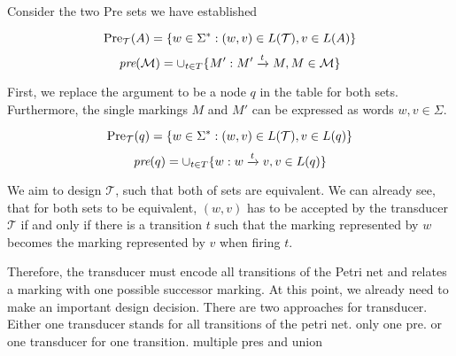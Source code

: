 \par

Consider the two Pre sets we have established

\begin{equation*}
\text{Pre}_{\mathcal{T}}(A) = \{ w \in \Sigma^{*}: (w,v) \in L(\mathcal{T}), v \in L(A) \} \\
\end{equation*}
\begin{equation*}
\operatorname{\textit{pre}}(\mathcal{M}) = \cup_{t \in T} \{M': M' \xrightarrow{t} M, M \in \mathcal{M} \}
\end{equation*}

First, we replace the argument to be a node $q$ in the table for both sets. Furthermore, the single markings $M$ and $M'$ can be expressed as words $w,v \in \Sigma$. 

\begin{equation*}
\text{Pre}_{\mathcal{T}}(q) = \{ w \in \Sigma^{*}: (w,v) \in L(\mathcal{T}), v \in L(q) \} \\
\end{equation*}
\begin{equation*}
\operatorname{\textit{pre}}(q) = \cup_{t \in T} \{w: w \xrightarrow{t} v, v \in L(q) \}
\end{equation*}

We aim to design $\mathcal{T}$, such that both of sets are equivalent. We can already see, that for both sets to be equivalent, $(w,v)$ has to be accepted by the transducer $\mathcal{T}$ if and only if there is a transition $t$ such that the marking represented by $w$ becomes the marking represented by $v$ when firing $t$.

\par

Therefore, the transducer must encode all transitions of the Petri net and relates a marking with one possible successor marking.
At this point, we already need to make an important design decision. There are two approaches for transducer. Either one transducer stands for all transitions of the petri net. only one pre. or one transducer for one transition. multiple pres and union


